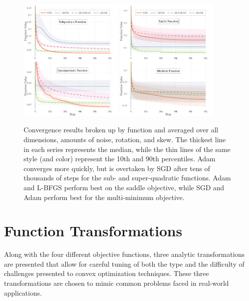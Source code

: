 \documentclass[conference]{ieeeconf}  %
\begin{document}
\begin{figure}
  \centering
  \includegraphics[width=0.45\textwidth]{Figures/final-function-1}
  \includegraphics[width=0.45\textwidth]{Figures/final-function-2}
  \caption{Convergence results broken up by function and averaged over
    all dimensions, amounts of noise, rotation, and skew. The thickest
    line in each series represents the median, while the thin lines of
    the same style (and color) represent the 10th and 90th
    percentiles. Adam converges more quickly, but is overtaken by SGD
    after tens of thousands of steps for the sub- and super-quadratic
    functions. Adam and L-BFGS perform best on the saddle objective,
    while SGD and Adam perform best for the multi-minimum objective.}
  \label{fig:results-function}
\end{figure}

\section{Function Transformations}

Along with the four different objective functions, three analytic
transformations are presented that allow for careful tuning of both
the type and the difficulty of challenges presented to convex
optimization techniques. These three transformations are chosen to
mimic common problems faced in real-world applications.
\end{document}
